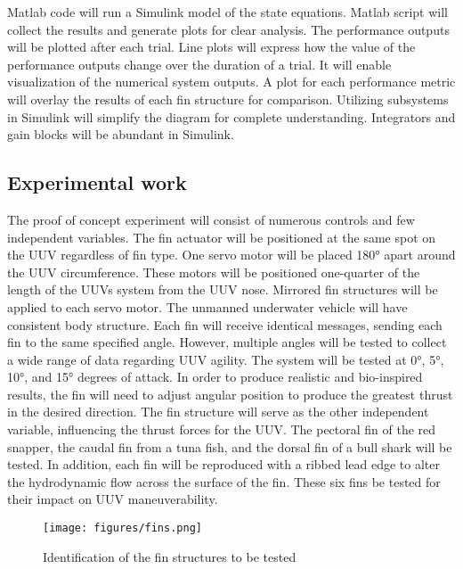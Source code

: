 \documentclass[]{IEEEtran}
\begin{document}
Matlab code will run a Simulink model of the state equations.  Matlab script will collect the results and generate plots for clear analysis.  The performance outputs will be plotted after each trial.  Line plots will express how the value of the performance outputs change over the duration of a trial.  It will enable visualization of the numerical system outputs.  A plot for each performance metric will overlay the results of each fin structure for comparison.  Utilizing subsystems in Simulink will simplify the diagram for complete understanding.  Integrators and gain blocks will be abundant in Simulink.

\subsection{Experimental work}
The proof of concept experiment will consist of numerous controls and few independent variables.  The fin actuator will be positioned at the same spot on the UUV regardless of fin type.  One servo motor will be placed \ang{180} apart around the UUV circumference.  These motors will be positioned one-quarter of the length of the UUVs system from the UUV nose.  Mirrored fin structures will be applied to each servo motor.  The unmanned underwater vehicle will have consistent body structure.  Each fin will receive identical messages, sending each fin to the same specified angle.  However, multiple angles will be tested to collect a wide range of data regarding UUV agility.  The system will be tested at \ang{0}, \ang{5}, \ang{10}, and \ang{15} degrees of attack.  In order to produce realistic and bio-inspired results, the fin will need to adjust angular position to produce the greatest thrust in the desired direction.  The fin structure will serve as the other independent variable, influencing the thrust forces for the UUV.  The pectoral fin of the red snapper, the caudal fin from a tuna fish, and the dorsal fin of a bull shark will be tested.  In addition, each fin will be reproduced with a ribbed lead edge to alter the hydrodynamic flow across the surface of the fin.  These six fins be tested for their impact on UUV maneuverability.  
\begin{figure}
\begin{center}
\texttt{[image: figures/fins.png]}
\end{center}
\caption{Identification of the fin structures to be tested}
\label{fig:5}
\end{figure}
\end{document}
